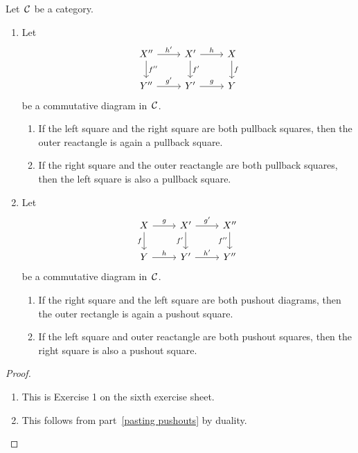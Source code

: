 \begin{lemma*}
  Let~$\mathcal{C}$ be a category.
  \begin{enumerate}
    \item
      Let
      \[
        \begin{tikzcd}
            X''
            \arrow{r}[above]{h'}
            \arrow{d}[right]{f''}
          & X'
            \arrow{r}[above]{h}
            \arrow{d}[right]{f'}
          & X
            \arrow{d}[right]{f}
          \\
            Y''
            \arrow{r}[above]{g'}
          & Y'
            \arrow{r}[above]{g}
          & Y
        \end{tikzcd}
      \]
      be a commutative diagram in~$\mathcal{C}$.
      \begin{enumerate}
        \item
          If the left square and the right square are both pullback squares, then the outer reactangle is again a pullback square.
        \item
          If the right square and the outer reactangle are both pullback squares, then the left square is also a pullback square.
      \end{enumerate}
    \item
      \label{pasting pushouts}
      Let
      \[
        \begin{tikzcd}
            X
            \arrow{r}[above]{g}
            \arrow{d}[left]{f}
          & X'
            \arrow{r}[above]{g'}
            \arrow{d}[left]{f'}
          & X''
            \arrow{d}[left]{f''}
          \\
            Y
            \arrow{r}[above]{h}
          & Y'
            \arrow{r}[above]{h'}
          & Y''
        \end{tikzcd}
      \]
      be a commutative diagram in~$\mathcal{C}$.
      \begin{enumerate}
        \item
          If the right square and the left square are both pushout diagrams, then the outer rectangle is again a pushout square.
        \item
          If the left square and outer reactangle are both pushout squares, then the right square is also a pushout square.
      \end{enumerate}
  \end{enumerate}
\end{lemma*}


\begin{proof}
  \leavevmode
  \begin{enumerate}
    \item
      This is Exercise 1 on the sixth exercise sheet.
    \item
      This follows from part~\ref*{pasting pushouts} by duality.
    \qedhere
  \end{enumerate}
\end{proof}


